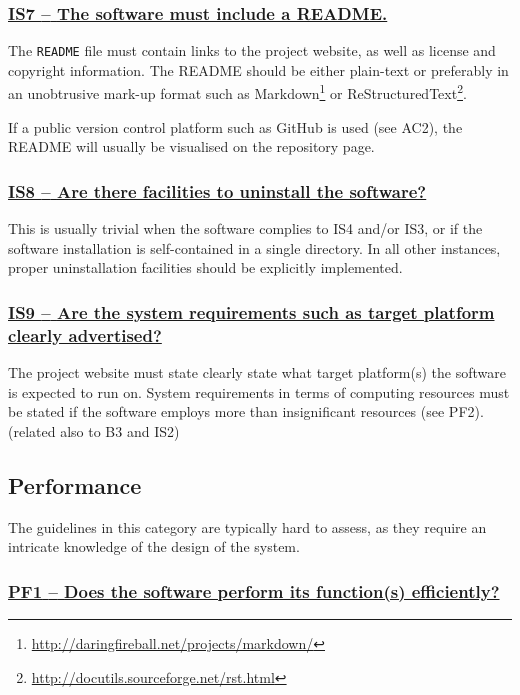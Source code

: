 \documentclass[a4paper,11pt]{article}
\newcommand{\indicator}[1]{\subsubsection*{\underline{#1}}}
\begin{document}
\newcommand{\isSevenName}{IS7}
\newcommand{\isSevenID}{\isSevenName}
\newcommand{\isSevenText}{The software must include a README.}
\indicator{\isSevenName{ }--{ }\isSevenText}\label{id:is7} 

The \texttt{README} file must contain links to the project website, as well as
license and copyright information. The README should be either plain-text or
preferably in an unobtrusive mark-up format such as
Markdown\footnote{\url{http://daringfireball.net/projects/markdown/}} or
ReStructuredText\footnote{\url{http://docutils.sourceforge.net/rst.html}}.

If a public version control platform such as GitHub is used (see AC2), the
README will usually be visualised on the repository page.

\newcommand{\isEightName}{IS8}
\newcommand{\isEightID}{\isEightName}
\newcommand{\isEightText}{Are there facilities to uninstall the software?}
\indicator{\isEightName{ }--{ }\isEightText}\label{id:is8} 

This is usually trivial when the software complies to IS4 and/or IS3, or if the
software installation is self-contained in a single directory. In all other
instances, proper uninstallation facilities should be explicitly implemented.

\newcommand{\isNineName}{IS9}
\newcommand{\isNineID}{\isNineName}
\newcommand{\isNineText}{Are the system requirements such as target platform clearly advertised?}
\indicator{\isNineName{ }--{ }\isNineText}\label{id:is9} 

The project website must state clearly state what target platform(s) the software is expected to run on.
System requirements in terms of computing resources must be stated if the software employs more than insignificant resources (see PF2).
(related also to B3 and IS2)

\subsection{Performance}\label{sec:per}

The guidelines in this category are typically hard to assess, as they require
an intricate knowledge of the design of the system. 

\newcommand{\pfOneName}{PF1}
\newcommand{\pfOneID}{\pfOneName}
\newcommand{\pfOneText}{Does the software perform its function(s) efficiently?}
\indicator{\pfOneName{ }--{ }\pfOneText}\label{id:pf1} 
\end{document}
